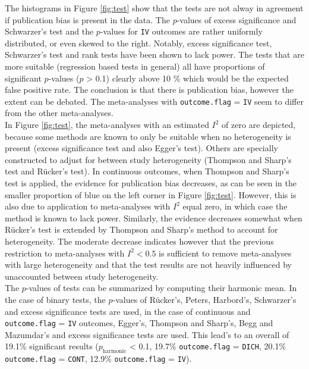 \documentclass[11pt,a4paper,twoside]{book}\usepackage[]{graphicx}\usepackage[]{color}
\begin{document}
The histograms in Figure \ref{fig:test} show that the tests are not alway in agreement if publication bias is present in the data. The $p$-values of excess significance and Schwarzer's test and the $p$-values for \texttt{IV} outcomes are rather uniformly distributed, or even skewed to the right. Notably, excess significance test, Schwarzer's test and rank tests have been shown to lack power. The tests that are more suitable (regression based tests in general) all have proportions of significant $p$-values ($p$ > 0.1) clearly above 10 \% which would be the expected false positive rate. The conclusion is that there is publication bias, however the extent can be debated. The meta-analyses with \texttt{outcome.flag} = \texttt{IV} seem to differ from the other meta-analyses. \\
In Figure \ref{fig:test}, the meta-analyses with an estimated $I^2$ of zero are depicted, because some methods are known to only be suitable when no heterogeneity is present (excess significance test and also Egger's test). Others are specially constructed to adjust for between study heterogeneity (Thompson and Sharp's test and R\"ucker's test). In continuous outcomes, when Thompson and Sharp's test is applied, the evidence for publication bias decreases, as can be seen in the smaller proportion of blue on the left corner in Figure \ref{fig:test}. However, this is also due to application to meta-analyses with $I^2$ equal zero, in which case the method is known to lack power. Similarly, the evidence decreases somewhat when R\"ucker's test is extended by Thompson and Sharp's method to account for heterogeneity. The moderate decrease indicates however that the previous restriction to meta-analyses with $I^2 < 0.5$ is sufficient to remove meta-analyses with large heterogeneity and that the test results are not heavily influenced by unaccounted between study heterogeneity. \\
The $p$-values of tests can be summarized by computing their harmonic mean. In the case of binary tests, the $p$-values of R\"ucker's, Peters, Harbord's, Schwarzer's and excess significance tests are used, in the case of continuous and \texttt{outcome.flag} = \texttt{IV} outcomes, Egger's, Thompson and Sharp's, Begg and Mazumdar's and excess significance tests are used. This lead's to an overall of 19.1\% significant results ($p_\textrm{harmonic}$ < 0.1, 19.7\% \texttt{outcome.flag} = \texttt{DICH}, 20.1\% \texttt{outcome.flag} = \texttt{CONT}, 12.9\% \texttt{outcome.flag} = \texttt{IV}).
\end{document}
